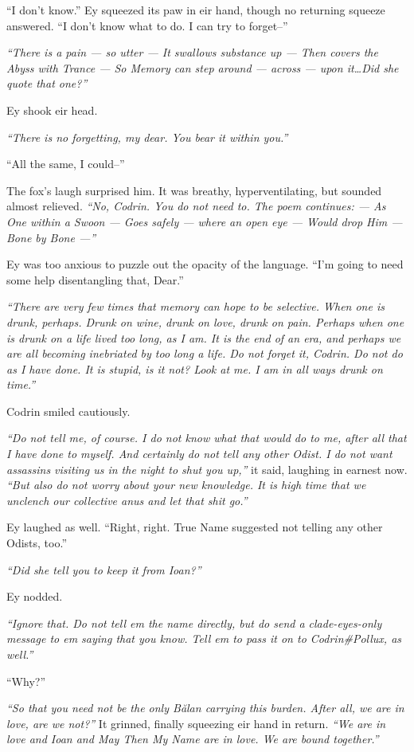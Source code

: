 ``I don't know.'' Ey squeezed its paw in eir hand, though no returning squeeze answered. ``I don't know what to do. I can try to forget--''

\emph{``There is a pain — so utter — It swallows substance up — Then covers the Abyss with Trance — So Memory can step around — across — upon it\ldots Did she quote that one?''}

Ey shook eir head.

\emph{``There is no forgetting, my dear. You bear it within you.''}

``All the same, I could--''

The fox's laugh surprised him. It was breathy, hyperventilating, but sounded almost relieved. \emph{``No, Codrin. You do not need to. The poem continues: — As One within a Swoon — Goes safely — where an open eye — Would drop Him — Bone by Bone —''}

Ey was too anxious to puzzle out the opacity of the language. ``I'm going to need some help disentangling that, Dear.''

\emph{``There are very few times that memory can hope to be selective. When one is drunk, perhaps. Drunk on wine, drunk on love, drunk on pain. Perhaps when one is drunk on a life lived too long, as I am. It is the end of an era, and perhaps we are all becoming inebriated by too long a life. Do not forget it, Codrin. Do not do as I have done. It is stupid, is it not? Look at me. I am in all ways drunk on time.''}

Codrin smiled cautiously.

\emph{``Do not tell me, of course. I do not know what that would do to me, after all that I have done to myself. And certainly do not tell any other Odist. I do not want assassins visiting us in the night to shut you up,''} it said, laughing in earnest now. \emph{``But also do not worry about your new knowledge. It is high time that we unclench our collective anus and let that shit go.''}

Ey laughed as well. ``Right, right. True Name suggested not telling any other Odists, too.''

\emph{``Did she tell you to keep it from Ioan?''}

Ey nodded.

\emph{``Ignore that. Do not tell em the name directly, but do send a clade-eyes-only message to em saying that you know. Tell em to pass it on to Codrin\#Pollux, as well.''}

``Why?''

\emph{``So that you need not be the only Bălan carrying this burden. After all, we are in love, are we not?''} It grinned, finally squeezing eir hand in return. \emph{``We are in love and Ioan and May Then My Name are in love. We are bound together.''}

